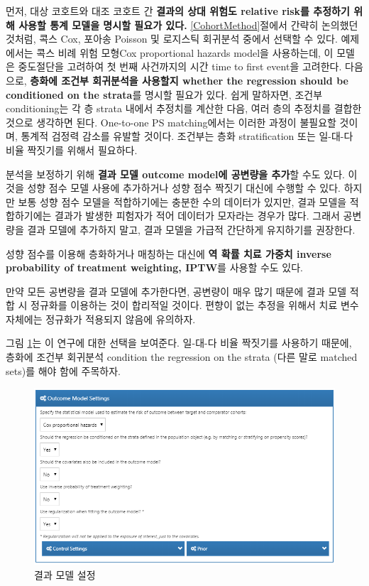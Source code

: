 \documentclass[10.5pt]{book}
\theoremstyle{definition}
\theoremstyle{definition}
\theoremstyle{definition}
\theoremstyle{remark}
\begin{document}
먼저, 대상 코호트와 대조 코호트 간 \textbf{결과의 상대 위험도 relative
risk를 추정하기 위해 사용할 통계 모델을 명시할 필요가 있다.}
\ref{CohortMethod}절에서 간략히 논의했던 것처럼, 콕스 Cox, 포아송
Poisson 및 로지스틱 회귀분석 중에서 선택할 수 있다. 예제에서는 콕스 비례
위험 모형Cox proportional hazards model을 사용하는데, 이 모델은
중도절단을 고려하여 첫 번째 사건까지의 시간 time to first event을
고려한다. 다음으로, \textbf{층화에 조건부 회귀분석을 사용할지 whether
the regression should be conditioned on the strata}를 명시할 필요가
있다. 쉽게 말하자면, 조건부 conditioning는 각 층 strata 내에서 추정치를
계산한 다음, 여러 층의 추정치를 결합한 것으로 생각하면 된다. One-to-one
PS matching에서는 이러한 과정이 불필요할 것이며, 통계적 검정력 감소를
유발할 것이다. 조건부는 층화 stratification 또는 일-대-다 비율 짝짓기를
위해서 필요하다. 

분석을 보정하기 위해 \textbf{결과 모델 outcome model에 공변량을 추가}할
수도 있다. 이것을 성향 점수 모델 사용에 추가하거나 성향 점수 짝짓기
대신에 수행할 수 있다. 하지만 보통 성향 점수 모델을 적합하기에는 충분한
수의 데이터가 있지만, 결과 모델을 적합하기에는 결과가 발생한 피험자가
적어 데이터가 모자라는 경우가 많다. 그래서 공변량을 결과 모델에 추가하지
말고, 결과 모델을 가급적 간단하게 유지하기를 권장한다.

성향 점수를 이용해 층화하거나 매칭하는 대신에 \textbf{역 확률 치료
가중치 inverse probability of treatment weighting, IPTW}를 사용할 수도
있다.

만약 모든 공변량을 결과 모델에 추가한다면, 공변량이 매우 많기 때문에
결과 모델 적합 시 정규화를 이용하는 것이 합리적일 것이다. 편향이 없는
추정을 위해서 치료 변수 자체에는 정규화가 적용되지 않음에 유의하자.

그림 \ref{fig:outcomeModelSettings}는 이 연구에 대한 선택을 보여준다.
일-대-다 비율 짝짓기를 사용하기 때문에, 층화에 조건부 회귀분석 condition
the regression on the strata (다른 말로 matched sets)를 해야 함에
주목하자.

\begin{figure}

{\centering \includegraphics[width=1\linewidth]{images/PopulationLevelEstimation/outcomeModelSettings} 

}

\caption{결과 모델 설정}\label{fig:outcomeModelSettings}
\end{figure}
\end{document}
